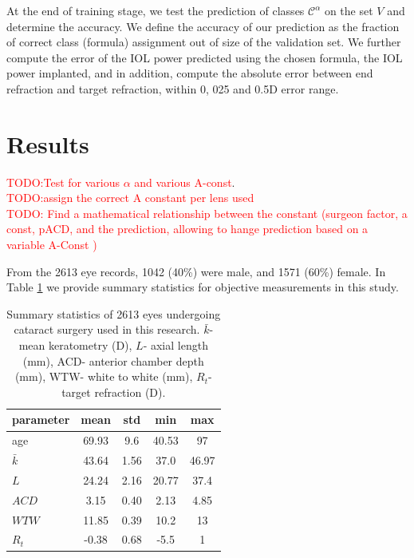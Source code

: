 \documentclass[article,twocolumn,preprint,10pt]{paper}%
\renewcommand{\(}{\left(}
\renewcommand{\)}{\right)}
\renewcommand{\[}{\left[}
\renewcommand{\]}{\right]}
\newcommand{\red}{\textcolor{red}}
\newcommand{\1}{\mbox{\boldmath$1$}}
\begin{document}
At the end of training stage, we test the prediction of classes $\mathcal{C}^\alpha$ on the set $V$ and determine the accuracy. We define the accuracy of our prediction as the fraction of correct class (formula) assignment out of size of the validation set. We further compute the error of the IOL power predicted using the chosen formula, the IOL power implanted, and in addition, compute the absolute error between end refraction and target refraction, within 0, 025 and 0.5D error range. 
 


\section{Results}
\red{TODO:Test  for various $\alpha$ and various A-const}.\\
\red{TODO:assign the correct A constant per lens used}\\
\red{TODO: Find a mathematical relationship between the constant (surgeon factor, a const, pACD, and the prediction, allowing to hange prediction based on a variable A-Const )}

From the 2613 eye records, 1042 (40\%) were male, and 1571 (60\%) female.
In Table \ref{table:summaryStatistics} we provide summary statistics for objective measurements in this study.

\begin{table}
	\begin{tabular}{l|c|c|c|c}
		parameter	   	&mean& std& min& max \\
		\hline 
		\hline
		age          & 69.93 & 9.6  & 40.53 & 97\\
		$\bar{k}$ & 43.64 & 1.56 & 37.0   & 46.97\\
		$L$          & 24.24 & 2.16 & 20.77 & 37.4\\
		$ACD$	  & 3.15   & 0.40 & 2.13  & 4.85\\
		$WTW$	& 11.85  & 0.39 & 10.2  & 13\\
		$R_t$	   & -0.38  & 0.68 & -5.5  & 1 \\
		
	\end{tabular} 
	\caption{Summary statistics of 2613 eyes undergoing cataract surgery used in this research. $\bar{k}$- mean keratometry (D), $L$- axial length (mm), ACD- anterior chamber depth (mm), WTW- white to white (mm), $R_t$- target refraction (D).}
	\label{table:summaryStatistics}
\end{table}
\end{document}
